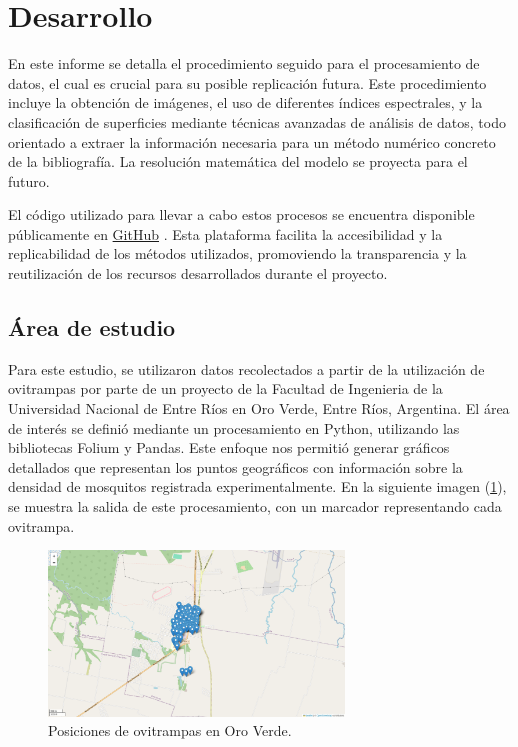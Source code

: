 

\section{Desarrollo}

En este informe se detalla el procedimiento seguido para el procesamiento de datos, el cual es crucial para su posible replicación futura. Este procedimiento incluye la obtención de imágenes, el uso de diferentes índices espectrales, y la clasificación de superficies mediante técnicas avanzadas de análisis de datos, todo orientado a extraer la información necesaria para un método numérico concreto de la bibliografía. La resolución matemática del modelo se proyecta para el futuro.

El código utilizado para llevar a cabo estos procesos se encuentra disponible públicamente en \href{https://github.com/justog220/TIF-Geomatica/}{GitHub} . Esta plataforma facilita la accesibilidad y la replicabilidad de los métodos utilizados, promoviendo la transparencia y la reutilización de los recursos desarrollados durante el proyecto.

\subsection{Área de estudio}

Para este estudio, se utilizaron datos recolectados a partir de la utilización de ovitrampas por parte de un proyecto de la Facultad de Ingenieria de la Universidad Nacional de Entre Ríos en Oro Verde, Entre Ríos, Argentina. El área de interés se definió mediante un procesamiento en Python, utilizando las bibliotecas Folium y Pandas. Este enfoque nos permitió generar gráficos detallados que representan los puntos geográficos con información sobre la densidad de mosquitos registrada experimentalmente. En la siguiente imagen (\figurename \ref{fig:ovitrampas}), se muestra la salida de este procesamiento, con un marcador representando cada ovitrampa.
	
\begin{figure}[H]
	\includegraphics[width=0.7\textwidth]{ovitrampas.png}
	\centering
	\caption{Posiciones de ovitrampas en Oro Verde.}
	\label{fig:ovitrampas}
	
\end{figure}

